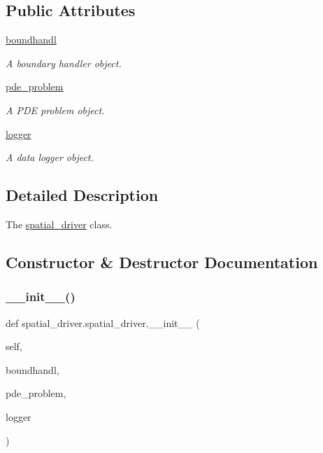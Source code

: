 \subsection*{Public Attributes}
\begin{DoxyCompactItemize}
\item 
\hyperlink{classspatial__driver_1_1spatial__driver_aeb66b87c7c18067c8a9a16b47bcbbd2f}{boundhandl}
\begin{DoxyCompactList}\small\item\em A boundary handler object. \end{DoxyCompactList}\item 
\hyperlink{classspatial__driver_1_1spatial__driver_a22bfac114fe305ab4089d9ce0e71c678}{pde\+\_\+problem}
\begin{DoxyCompactList}\small\item\em A P\+DE problem object. \end{DoxyCompactList}\item 
\hyperlink{classspatial__driver_1_1spatial__driver_a5d9fcdf9d8185cb89fb1941038cfbbc8}{logger}
\begin{DoxyCompactList}\small\item\em A data logger object. \end{DoxyCompactList}\end{DoxyCompactItemize}


\subsection{Detailed Description}
The \hyperlink{classspatial__driver_1_1spatial__driver}{spatial\+\_\+driver} class. 

\subsection{Constructor \& Destructor Documentation}
\mbox{\label{classspatial__driver_1_1spatial__driver_a6574f876678eb408a66e7a64422a8a65}} 
\subsubsection{\texorpdfstring{\+\_\+\+\_\+init\+\_\+\+\_\+()}{\_\_init\_\_()}}
{\footnotesize\ttfamily def spatial\+\_\+driver.\+spatial\+\_\+driver.\+\_\+\+\_\+init\+\_\+\+\_\+ (\begin{DoxyParamCaption}\item[{}]{self,  }\item[{}]{boundhandl,  }\item[{}]{pde\+\_\+problem,  }\item[{}]{logger }\end{DoxyParamCaption})}



